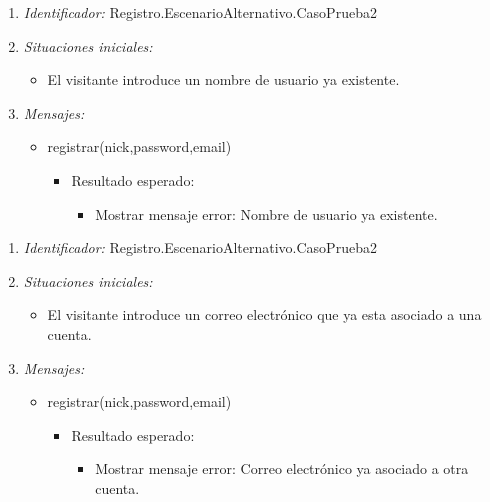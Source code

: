 \begin{enumerate}
	\item {\it Identificador:} Registro.EscenarioAlternativo.CasoPrueba2
	\item {\it Situaciones iniciales:}
    		\begin{itemize}
    			\item El visitante introduce un nombre de usuario ya existente.
		\end{itemize}
	\item {\it Mensajes:}
		\begin{itemize}
			\item registrar(nick,password,email)
				 \begin{itemize}
					 	\item Resultado esperado:
					 \begin{itemize}
					 	 \item Mostrar mensaje error: Nombre de usuario ya existente.
					 \end{itemize}
				 \end{itemize}
		\end{itemize}
\end{enumerate}

\begin{enumerate}
	\item {\it Identificador:} Registro.EscenarioAlternativo.CasoPrueba2
	\item {\it Situaciones iniciales:}
    		\begin{itemize}
    			\item El visitante introduce un correo electrónico que ya esta asociado a una cuenta.
		\end{itemize}
	\item {\it Mensajes:}
		\begin{itemize}
			\item registrar(nick,password,email)
				 \begin{itemize}
					 	\item Resultado esperado:
					 \begin{itemize}
					 	 \item Mostrar mensaje error: Correo electrónico ya asociado a otra cuenta.
					 \end{itemize}
				 \end{itemize}
		\end{itemize}
\end{enumerate}



